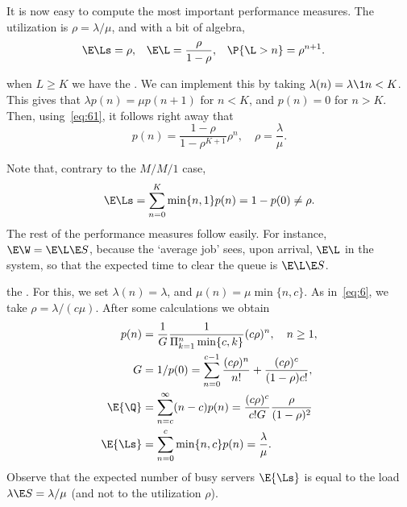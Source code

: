 It is now easy to compute the most important performance measures.
The utilization is $\rho=\lambda/\mu$, and with a bit of algebra,
\begin{align}\label{eq:el}
\E\Ls &= \rho, & \E \L &= \frac \rho{1-\rho}, & \P{\L> n} &= \rho^{n+1}.
\end{align}


 when $L\geq K$  we have the .
We can implement this by taking $\lambda(n) = \lambda \1{n < K}$.
This gives that $\lambda p(n) = \mu p(n+1)$ for $n<K$, and $p(n) = 0$ for $n>K$.
Then, using~\cref{eq:61}, it follows right away  that
 \begin{equation*}
p(n) = \frac{1-\rho}{1-\rho^{K+1}} \rho^n, \quad \rho = \frac{\lambda}{\mu}.
\end{equation*}

Note that, contrary to the $M/M/1$ case,
\begin{equation*}
\E\Ls = \sum_{n=0}^K \min\{n, 1\} p(n) = 1-p(0) \neq \rho.
\end{equation*}
The rest of the performance measures follow easily.
For instance, $\E\W = \E\L \E S$, because the `average job' sees, upon arrival, $\E\L$ in the system, so that the expected time to clear the queue is $\E\L \E S$.

 the .
For this, we set $\lambda(n) = \lambda$, and $\mu(n) = \mu \min\{n, c\}$.
As in~\cref{eq:6}, we take $\rho=\lambda/(c\mu)$.
After some calculations we obtain
\begin{subequations}
\begin{align}
p(n) &= \frac 1 {G} \frac{1}{\Pi_{k=1}^{n}\min\{c, k\}}(c\rho)^{n} , \quad n\geq 1,\label{eq:1}\\
G &=1/p(0) = \sum_{n=0}^{c-1} \frac{(c\rho)^n}{n!} + \frac{(c\rho)^c}{(1-\rho)c!}, \label{eq:501}\\
\E{\Q} &= \sum_{n=c}^\infty (n-c) p(n) = \frac{(c\rho)^c}{c! G}\frac{\rho}{(1-\rho)^2}\\
\E{\Ls} &= \sum_{n=0}^{c}\min\{n,c\} p(n)= \frac{\lambda}\mu.
\end{align}
\end{subequations}
Observe that the expected number of busy servers $\E{\Ls}$ is equal to the load $\lambda \E S=\lambda/\mu$ (and not to the utilization $\rho$).


